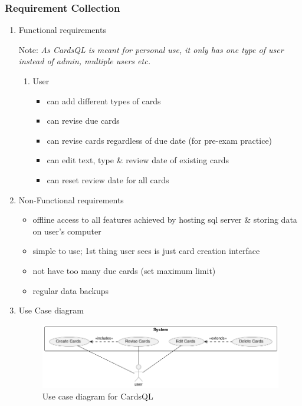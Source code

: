 \documentclass[a4paper]{article}
\begin{document}
\subsubsection{Requirement Collection}
\label{sec:orgcb0a550}
\begin{enumerate}
\item Functional requirements
\label{sec:orgf6e09d4}

Note: \emph{As CardsQL is meant for personal use, it only has one type of user instead of admin, multiple users etc.}
\begin{enumerate}
\item User
\label{sec:org8e2252e}
\begin{itemize}
\item can add different types of cards
\item can revise due cards
\item can revise cards regardless of due date (for pre-exam practice)
\item can edit text, type  \& review date of existing cards
\item can reset review date for all cards
\end{itemize}
\end{enumerate}
\item Non-Functional requirements
\label{sec:org4db7217}
\begin{itemize}
\item offline access to all features 
achieved by hosting sql server \& storing data on user's computer
\item simple to use;
1st thing user sees is just card creation interface
\item not have too many due cards (set maximum limit)
\item regular data backups
\end{itemize}
\item Use Case diagram
\label{sec:org90864bc}

\begin{figure}[htbp]
\centering
\includegraphics[width=400px]{diagrams/use-case-diagram.png}
\caption{Use case diagram for CardsQL}
\end{figure}

\FloatBarrier

\clearpage
\end{enumerate}
\end{document}

